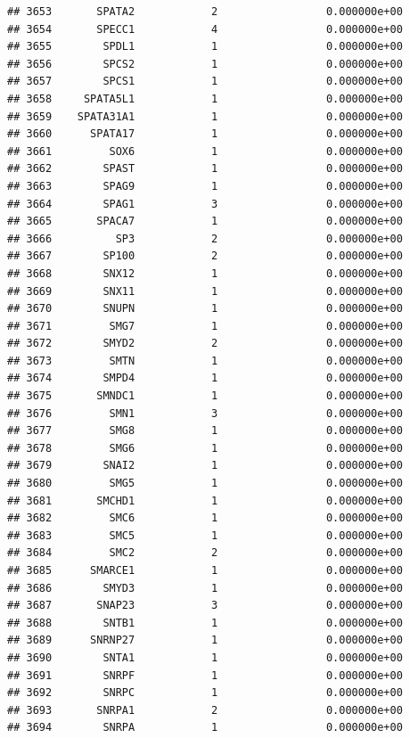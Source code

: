 \documentclass[
]{article}
\begin{document}
\begin{verbatim}
## 3653       SPATA2            2                 0.000000e+00
## 3654       SPECC1            4                 0.000000e+00
## 3655        SPDL1            1                 0.000000e+00
## 3656        SPCS2            1                 0.000000e+00
## 3657        SPCS1            1                 0.000000e+00
## 3658     SPATA5L1            1                 0.000000e+00
## 3659    SPATA31A1            1                 0.000000e+00
## 3660      SPATA17            1                 0.000000e+00
## 3661         SOX6            1                 0.000000e+00
## 3662        SPAST            1                 0.000000e+00
## 3663        SPAG9            1                 0.000000e+00
## 3664        SPAG1            3                 0.000000e+00
## 3665       SPACA7            1                 0.000000e+00
## 3666          SP3            2                 0.000000e+00
## 3667        SP100            2                 0.000000e+00
## 3668        SNX12            1                 0.000000e+00
## 3669        SNX11            1                 0.000000e+00
## 3670        SNUPN            1                 0.000000e+00
## 3671         SMG7            1                 0.000000e+00
## 3672        SMYD2            2                 0.000000e+00
## 3673         SMTN            1                 0.000000e+00
## 3674        SMPD4            1                 0.000000e+00
## 3675       SMNDC1            1                 0.000000e+00
## 3676         SMN1            3                 0.000000e+00
## 3677         SMG8            1                 0.000000e+00
## 3678         SMG6            1                 0.000000e+00
## 3679        SNAI2            1                 0.000000e+00
## 3680         SMG5            1                 0.000000e+00
## 3681       SMCHD1            1                 0.000000e+00
## 3682         SMC6            1                 0.000000e+00
## 3683         SMC5            1                 0.000000e+00
## 3684         SMC2            2                 0.000000e+00
## 3685      SMARCE1            1                 0.000000e+00
## 3686        SMYD3            1                 0.000000e+00
## 3687       SNAP23            3                 0.000000e+00
## 3688        SNTB1            1                 0.000000e+00
## 3689      SNRNP27            1                 0.000000e+00
## 3690        SNTA1            1                 0.000000e+00
## 3691        SNRPF            1                 0.000000e+00
## 3692        SNRPC            1                 0.000000e+00
## 3693       SNRPA1            2                 0.000000e+00
## 3694        SNRPA            1                 0.000000e+00

\end{verbatim}
\end{document}
